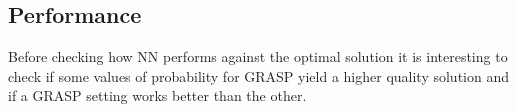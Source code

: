 


\subsection{Performance}

Before checking how NN performs against the optimal solution it is interesting to check if some values of probability for GRASP yield a higher quality solution and if a GRASP setting works better than the other.

